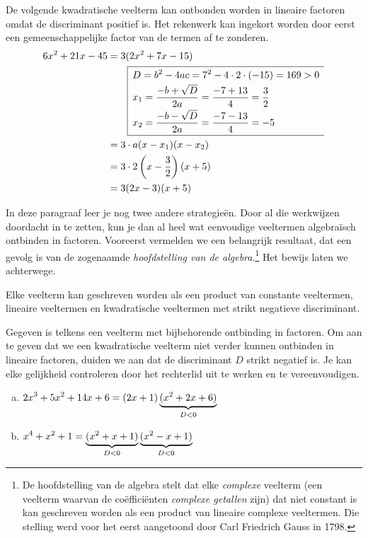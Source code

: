 \documentclass{ximera}
\begin{document}
\begin{example} 
De volgende kwadratische veelterm kan ontbonden worden in lineaire factoren omdat de discriminant positief is. Het rekenwerk kan ingekort worden door eerst een gemeenschappelijke factor van de termen af te zonderen. 
\begin{align*}
6x^2+21x-45 & = 3(2x^2 + 7x - 15) \\
& \qquad 
\begin{array}{|l}
\hline
\begin{aligned}
\vrule height 0.4cm width 0cm
& D = b^2 - 4ac = 7^2-4\cdot 2 \cdot (-15) = 169 > 0 \\[0.1cm] 
& x_{1} = \frac{-b + \sqrt{D}}{2a} = \frac{-7 + 13}{4} = \frac{3}{2} \\[0.1cm] 
& x_{2} = \frac{-b - \sqrt{D}}{2a} = \frac{-7 - 13}{4} = -5 \\[0.1cm]
\end{aligned} \\
\hline
\end{array} \\
& = 3 \cdot a(x-x_1)(x-x_2) \\
& = 3 \cdot 2\left(x- \frac{3}{2}\right)(x+5) \\
& = 3(2x-3)(x+5)
\end{align*}
\end{example} 

In deze paragraaf leer je nog twee andere strategie\"en. Door al die werkwijzen doordacht in te zetten, kun je dan al heel wat eenvoudige veeltermen algebra\"isch ontbinden in factoren. Vooreerst vermelden we een belangrijk resultaat, dat een gevolg is van de zogenaamde {\em hoofdstelling van de algebra}.\footnote{De hoofdstelling van de algebra stelt dat elke {\em complexe} veelterm (een veelterm waarvan de co\"effici\"enten {\em complexe getallen} zijn) dat niet constant is kan geschreven worden als een product van lineaire complexe veeltermen. Die stelling werd voor het eerst aangetoond door Carl Friedrich Gauss in 1798.} Het bewijs laten we achterwege.

\begin{theorem} 
Elke veelterm kan geschreven worden als een product van constante veeltermen, lineaire veel\-termen en kwadratische veeltermen met strikt negatieve discriminant.
\end{theorem} 

\begin{example} 
Gegeven is telkens een veelterm met bijbehorende ontbinding in factoren. Om aan te geven dat we een kwadratische veelterm niet verder kunnen ontbinden in lineaire factoren, duiden we aan dat de discriminant $D$ strikt negatief is. Je kan elke gelijkheid controleren door het rechterlid uit te werken en te vereenvoudigen. 
\begin{enumerate}[(a)]
\item
$\displaystyle 2x^3 + 5x^2 + 14x + 6 = (2x+1)\underbrace{(x^2+2x+6)}_{D < 0}$
\item
$\displaystyle x^4+x^2+1 = \underbrace{(x^2+x+1)}_{D < 0}\underbrace{(x^2-x+1)}_{D < 0}$
\end{enumerate}
\end{example} 
\end{document}
